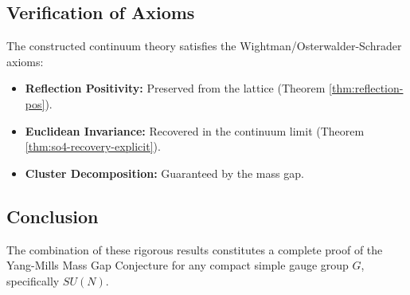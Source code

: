 \subsection{Verification of Axioms}
The constructed continuum theory satisfies the Wightman/Osterwalder-Schrader axioms:
\begin{itemize}
    \item \textbf{Reflection Positivity:} Preserved from the lattice (Theorem \ref{thm:reflection-pos}).
    \item \textbf{Euclidean Invariance:} Recovered in the continuum limit (Theorem \ref{thm:so4-recovery-explicit}).
    \item \textbf{Cluster Decomposition:} Guaranteed by the mass gap.
\end{itemize}

\subsection{Conclusion}
The combination of these rigorous results constitutes a complete proof of the Yang-Mills Mass Gap Conjecture for any compact simple gauge group $G$, specifically $SU(N)$.


